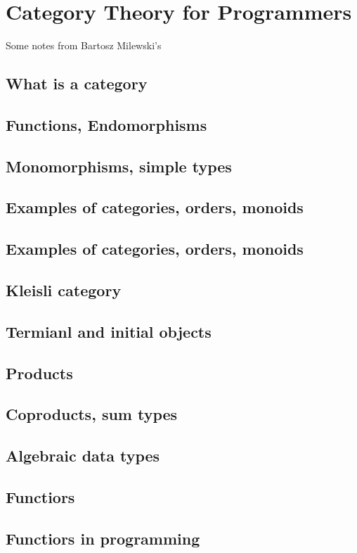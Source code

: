 \documentclass[12pt]{article}
\begin{document}
\section{Category Theory for Programmers }

Some notes from Bartosz Milewski's

\subsection{What is a category}
\subsection{Functions, Endomorphisms }
\subsection{Monomorphisms, simple types }
\subsection{Examples of categories, orders, monoids }
\subsection{Examples of categories, orders, monoids }
\subsection{Kleisli category }
\subsection{Termianl and initial objects }
\subsection{Products }
\subsection{Coproducts, sum types}
\subsection{Algebraic data types}
\subsection{Functiors }
\subsection{Functiors in programming }
\end{document}
